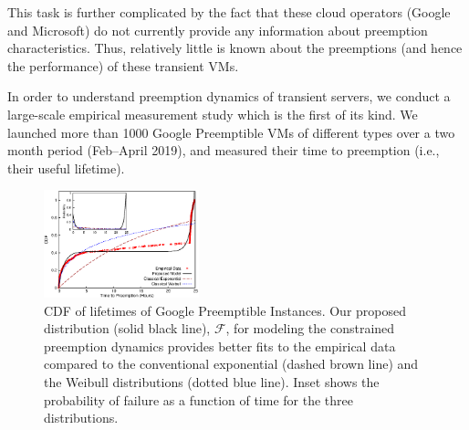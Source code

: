 This task is further complicated by the fact that these cloud operators (Google and Microsoft) do not currently provide any information about preemption characteristics. 
Thus, relatively little is known about the preemptions (and hence the performance) of these transient VMs. %

In order to understand preemption dynamics of transient servers, we conduct a large-scale empirical measurement study which is the first of its kind. 
We launched more than 1000 Google Preemptible VMs of different types over a two month period (Feb--April 2019), and measured their time to preemption (i.e., their useful lifetime).\footnotemark



\begin{figure}
  \centering
  \includegraphics[width=0.4\textwidth]{../graphs/scispot-fig-cdf-prob-inset-time.eps}
  \caption{CDF of lifetimes of Google Preemptible Instances. Our proposed distribution (solid black line), $\mathscr{F}$, for modeling the constrained preemption dynamics provides better fits to the empirical data compared to the conventional exponential (dashed brown line) and the Weibull distributions (dotted blue line). Inset shows the probability of failure as a function of time for the three distributions.}
  \label{fig:gcp1}
\end{figure}

